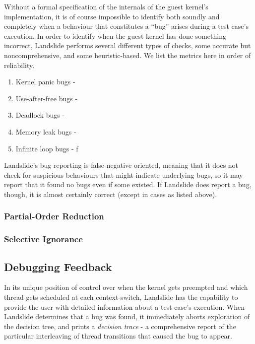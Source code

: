\documentclass[10pt,twocolumn]{article}
\begin{document}
Without a formal specification of the internals of the guest kernel's implementation, it is of course impossible to identify both soundly and completely when a behaviour that constitutes a ``bug'' arises during a test case's execution.
In order to identify when the guest kernel has done something incorrect, Landslide performs several different types of checks, some accurate but noncomprehensive, and some heuristic-based.
We list the metrics here in order of reliability.
\begin{enumerate}
	\item Kernel panic bugs - 
	\item Use-after-free bugs - 
	\item Deadlock bugs - 
	\item Memory leak bugs - %
	\item Infinite loop bugs - f
\end{enumerate}
Landslide's bug reporting is false-negative oriented, meaning that it does not check for suspicious behaviours that might indicate underlying bugs, so it may report that it found no bugs even if some existed. If Landslide does report a bug, though, it is almost certainly correct (except in cases as listed above).

\subsubsection{Partial-Order Reduction}
\label{sec:techniques-por}

\subsubsection{Selective Ignorance}

\subsection{Debugging Feedback}

In its unique position of control over when the kernel gets preempted and which thread gets scheduled at each context-switch, Landslide has the capability to provide the user with detailed information about a test case's execution.
When Landslide determines that a bug was found, it immediately aborts exploration of the decision tree, and prints a {\em decision trace} - a comprehensive report of the particular interleaving of thread transitions that caused the bug to appear.
\end{document}
